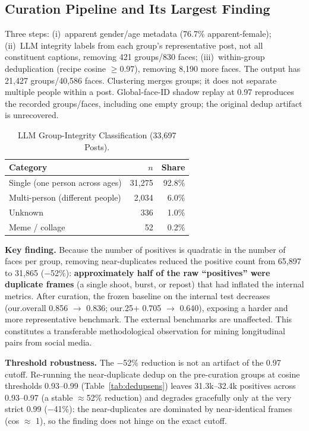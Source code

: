 \documentclass[journal]{IEEEtran}
\begin{document}
\subsection{Curation Pipeline and Its Largest Finding}\label{sec:data-curation}
Three steps: (i)~apparent gender/age metadata (76.7\% apparent-female); (ii)~LLM integrity labels from each group's representative post, not all constituent captions, removing 421 groups/830 faces; (iii)~within-group deduplication (recipe cosine $\geq$0.97), removing 8{,}190 more faces. The output has 21{,}427 groups/40{,}586 faces. Clustering merges groups; it does not separate multiple people within a post. Global-face-ID shadow replay at 0.97 reproduces the recorded groups/faces, including one empty group; the original dedup artifact is unrecovered.

\begin{table}[!t]
\renewcommand{\arraystretch}{1.2}
\caption{LLM Group-Integrity Classification (33{,}697 Posts).}
\label{tab:integrity}
\centering
\footnotesize
\begin{tabular}{@{}lrr@{}}
\toprule
Category & $n$ & Share \\
\midrule
Single (one person across ages) & 31{,}275 & 92.8\% \\
Multi-person (different people) & 2{,}034 & 6.0\% \\
Unknown & 336 & 1.0\% \\
Meme / collage & 52 & 0.2\% \\
\bottomrule
\end{tabular}
\end{table}

\textbf{Key finding.} Because the number of positives is quadratic in the number of faces per group, removing near-duplicates reduced the positive count from 65{,}897 to 31{,}865 ($-$52\%): \textbf{approximately half of the raw ``positives'' were duplicate frames} (a single shoot, burst, or repost) that had inflated the internal metrics. After curation, the frozen baseline on the internal test decreases (our.overall 0.856 $\rightarrow$ 0.836; our.25+ 0.705 $\rightarrow$ 0.640), exposing a harder and more representative benchmark. The external benchmarks are unaffected. This constitutes a transferable methodological observation for mining longitudinal pairs from social media.

\textbf{Threshold robustness.} The $-$52\% reduction is not an artifact of the 0.97 cutoff. Re-running the near-duplicate dedup on the pre-curation groups at cosine thresholds 0.93--0.99 (Table~\ref{tab:dedupsens}) leaves 31.3k--32.4k positives across 0.93--0.97 (a stable $\approx$52\% reduction) and degrades gracefully only at the very strict 0.99 ($-$41\%): the near-duplicates are dominated by near-identical frames (cos $\approx$ 1), so the finding does not hinge on the exact cutoff.
\end{document}
